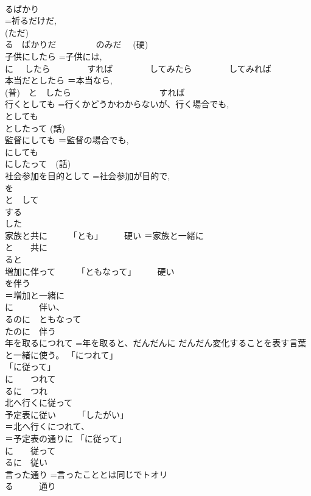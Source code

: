 \documentclass[8pt]{extreport}
\begin{document}
\begin{CJK}{UTF8}{min}
\\	るばかり 
\\	=祈るだけだ, 
\\	(ただ) 
\\	る　ばかりだ 　　　　 のみだ　 (硬)
\\	子供にしたら	=子供には, 
\\	に 　したら 　　　　すれば 　　　　してみたら 　　　　してみれば
\\	本当だとしたら	＝本当なら, 
\\	(普)　と　したら 　　　　　　　　　　すれば
\\	行くとしても	=行くかどうかわからないが、行く場合でも, 
\\	としても 
\\	としたって (話)
\\	監督にしても	＝監督の場合でも, 
\\	にしても 
\\	にしたって　(話)
\\	社会参加を目的として	=社会参加が目的で, 
\\	を 
\\	と　して
\\	する
\\	した
\\	家族と共に　　　「とも」　　　硬い	＝家族と一緒に 
\\	と　　共に 
\\	ると
\\	増加に伴って　　　「ともなって」　　　硬い	
\\	を伴う 
\\	＝増加と一緒に 
\\	に　　　伴い、 
\\	るのに　ともなって 
\\	たのに　伴う
\\	年を取るにつれて	=年を取ると、だんだんに だんだん変化することを表す言葉と一緒に使う。 「につれて」
\\	「に従って」
\\	に　　つれて 
\\	るに　つれ
\\	北へ行くに従って 
\\	予定表に従い　　　「したがい」	
\\	＝北へ行くにつれて、
\\	＝予定表の通りに 「に従って」
\\	に　　従って 
\\	るに　従い
\\	言った通り	=言ったこととは同じでトオリ 
\\	る　　　通り 

\end{CJK}
\end{document}
